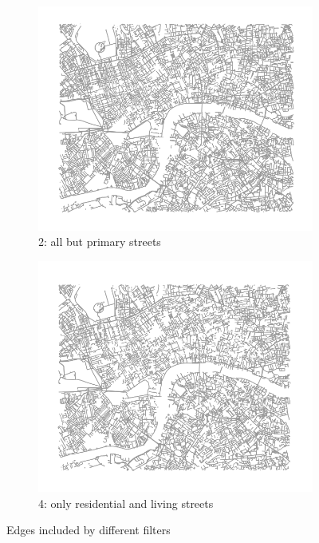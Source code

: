 \documentclass[11pt]{article} %
\begin{document}
\begin{figure}
\centering
\begin{subfigure}{.5\textwidth}
  \centering
  \includegraphics[width=1\linewidth]{bbox_bike_2_filter_cropped}
  \caption{2: all but primary streets}
  \label{fig:sub1}
\end{subfigure}%
\begin{subfigure}{.5\textwidth}
  \centering
  \includegraphics[width=1\linewidth]{bbox_bike_4_filter_cropped}
  \caption{4: only residential and living streets}
  \label{fig:sub2}
\end{subfigure}
\caption{Edges included by different filters}
\label{fig:test}
\end{figure}
\end{document}

